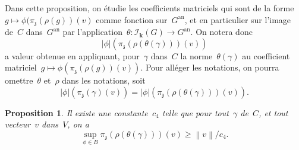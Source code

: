 \documentclass[french]{amsart}
\newcommand{\kk}{\mathbf{k}}
\newcommand{\abs}[1]{{\left|{#1}\right|}}
\newcommand{\Ik}{\mathscr{I}_\kk}
\newcommand{\an}{\textrm{an}}
\newcommand{\lie}[1]{{\mathfrak{#1}}}
\newcommand{\Nm}[1]{{\left\|{#1}\right\|}}
\newcommand{\z}{\lie{z}}
\newtheorem{proposition}{Proposition}[section]
\begin{document}
Dans cette proposition, on étudie les coefficients matriciels qui sont de la forme~$g\mapsto\phi(\pi_\z(\rho(g))(v)$ comme fonction sur~$G^\an$, et en particulier sur l'image de~$C$ dans~$G^\an$ par l'application~$\theta:\Ik(G)\to G^\an$. On notera donc
\[
\abs{\phi}(\pi_\z(\rho(\theta(\gamma)))(v))
\]
a valeur obtenue en appliquant, pour~$\gamma$ dans~$C$ la norme~$\theta(\gamma)$ au coefficient matriciel~$g\mapsto\phi(\pi_\z(\rho(g))(v))$. Pour alléger les notations, on pourra omettre~$\theta$ et~$\rho$ dans les notations, soit
\[
\abs{\phi}(\pi_\z(\gamma)(v))
=
\abs{\phi}(\pi_\z(\rho(\theta(\gamma)))(v)).
\]
\begin{proposition}\label{Prop39}
Il existe une constante~$c_4$ telle que pour tout~$\gamma$ de~$C$, et tout vecteur~$v$ dans~$V$, on a
\begin{equation}\label{eq12}
\sup_{\phi\in B}\pi_{\z}(\rho(\theta(\gamma)))(v)\geq\Nm{v}/c_4.
\end{equation}
\end{proposition}
\end{document}
